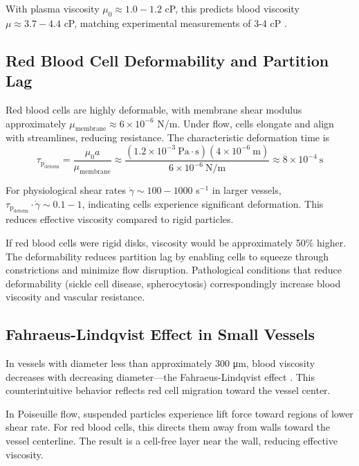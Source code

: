 \documentclass[10pt,twocolumn,a4paper]{article}
\theoremstyle{remark}
\newcommand{\taulag}{\tau_{\mathrm{p}}}
\begin{document}
With plasma viscosity $\mu_{0} \approx 1.0-1.2$ cP, this predicts blood viscosity $\mu \approx 3.7-4.4$ cP, matching experimental measurements of 3-4 cP \cite{chien1970blood}.

\subsection{Red Blood Cell Deformability and Partition Lag}

Red blood cells are highly deformable, with membrane shear modulus approximately $\mu_{\mathrm{membrane}} \approx 6 \times 10^{-6}$ N/m. Under flow, cells elongate and align with streamlines, reducing resistance. The characteristic deformation time is
\begin{equation}
\taulag_{\mathrm{deform}} = \frac{\mu_{0} a}{\mu_{\mathrm{membrane}}} \approx \frac{(1.2 \times 10^{-3}~\mathrm{Pa \cdot s})(4 \times 10^{-6}~\mathrm{m})}{6 \times 10^{-6}~\mathrm{N/m}} \approx 8 \times 10^{-4}~\mathrm{s}
\end{equation}

For physiological shear rates $\dot{\gamma} \sim 100-1000$ s$^{-1}$ in larger vessels, $\taulag_{\mathrm{deform}} \cdot \dot{\gamma} \sim 0.1-1$, indicating cells experience significant deformation. This reduces effective viscosity compared to rigid particles.

If red blood cells were rigid disks, viscosity would be approximately 50\% higher. The deformability reduces partition lag by enabling cells to squeeze through constrictions and minimize flow disruption. Pathological conditions that reduce deformability (sickle cell disease, spherocytosis) correspondingly increase blood viscosity and vascular resistance.

\subsection{Fahraeus-Lindqvist Effect in Small Vessels}

In vessels with diameter less than approximately 300 μm, blood viscosity decreases with decreasing diameter—the Fahraeus-Lindqvist effect \cite{fahraeus1931viscosity}. This counterintuitive behavior reflects red cell migration toward the vessel center.

In Poiseuille flow, suspended particles experience lift force toward regions of lower shear rate. For red blood cells, this directs them away from walls toward the vessel centerline. The result is a cell-free layer near the wall, reducing effective viscosity.
\end{document}
